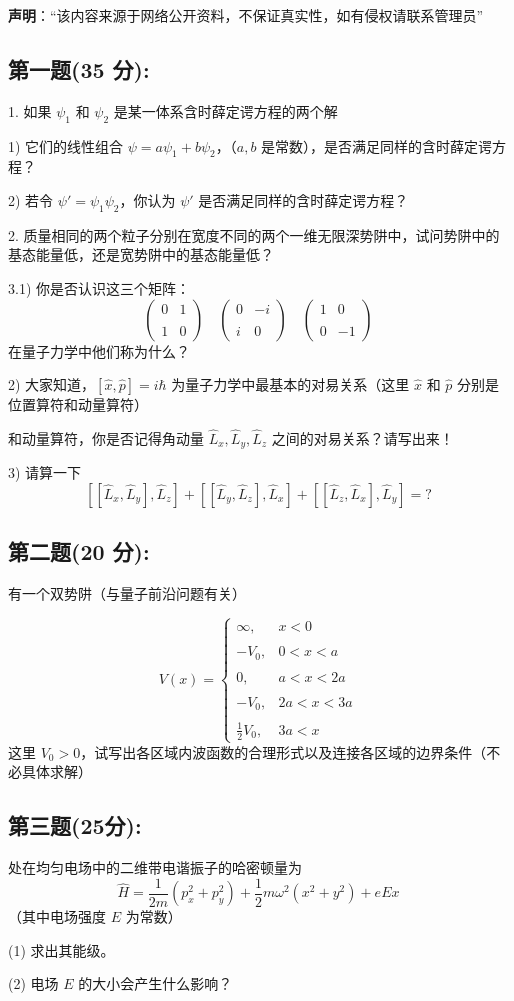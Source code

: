 
\textbf{声明}：“该内容来源于网络公开资料，不保证真实性，如有侵权请联系管理员”

\subsection{第一题(35 分):}
1. 如果 $\psi_1$ 和 $\psi_2$ 是某一体系含时薛定谔方程的两个解

1) 它们的线性组合 $\psi = a\psi_1 + b\psi_2$，（$a, b$ 是常数），是否满足同样的含时薛定谔方程？

2) 若令 $\psi' = \psi_1\psi_2$，你认为 $\psi'$ 是否满足同样的含时薛定谔方程？

2. 质量相同的两个粒子分别在宽度不同的两个一维无限深势阱中，试问势阱中的基态能量低，还是宽势阱中的基态能量低？

3.1) 你是否认识这三个矩阵：
\[\begin{pmatrix}0 & 1 \\\\1 & 0\end{pmatrix}\quad\begin{pmatrix}0 & -i \\\\i & 0\end{pmatrix}\quad\begin{pmatrix}1 & 0 \\\\0 & -1\end{pmatrix}~\]
在量子力学中他们称为什么？

2) 大家知道，$[\hat{x}, \hat{p}] = i\hbar$ 为量子力学中最基本的对易关系（这里 $\hat{x}$ 和 $\hat{p}$ 分别是位置算符和动量算符）

和动量算符，你是否记得角动量 $\hat{L}_x, \hat{L}_y, \hat{L}_z$ 之间的对易关系？请写出来！

3) 请算一下
\[[[\hat{L}_x, \hat{L}_y], \hat{L}_z] + [[\hat{L}_y, \hat{L}_z], \hat{L}_x] + [[\hat{L}_z, \hat{L}_x], \hat{L}_y] = ?~\]
\subsection{第二题(20 分):}
有一个双势阱（与量子前沿问题有关）

\[V(x) =\begin{cases} \infty, & x < 0 \\\\-V_0, & 0 < x < a \\\\0, & a < x < 2a \\\\-V_0, & 2a < x < 3a \\\\\frac{1}{2} V_0, & 3a < x \end{cases}~\]
这里 $V_0 > 0$，试写出各区域内波函数的合理形式以及连接各区域的边界条件（不必具体求解）

\subsection{第三题(25分):}
处在均匀电场中的二维带电谐振子的哈密顿量为
\[\hat{H} = \frac{1}{2m} (p_x^2 + p_y^2) + \frac{1}{2} m\omega^2 (x^2 + y^2) + eEx~\]
（其中电场强度 $E$ 为常数）

(1) 求出其能级。

(2) 电场 $E$ 的大小会产生什么影响？